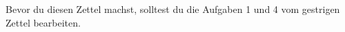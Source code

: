 \documentclass{../uebungszettel}
\begin{document}
\noindent

Bevor du diesen Zettel machst, solltest du die Aufgaben 1
und 4 vom gestrigen Zettel bearbeiten.








\end{document}

